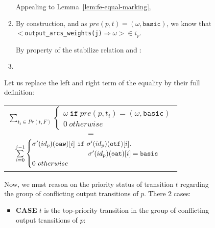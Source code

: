 \documentclass[dvipsnames,12pt]{article}
\begin{document}
\begin{niproof}
\begin{enumerate}
\begin{itemize}
\begin{itemize}
\begin{enumerate}
          Appealing to Lemma~\ref{lem:fe-equal-marking},
        \item {}

          By construction, and as
          $pre(p,t)=(\omega,\mathtt{basic})$, we know that
          ${<}$\texttt{output\_arcs\_weights(j)}$\Rightarrow\omega{>}\in{}i_p$.

          By property of the stabilize relation and \InCsCompP:\\
          
        \item
        \end{enumerate}
        
        Let us replace the left and right term of the equality by
        their full definition:

        \begin{frameb}
          \begin{tabular}{c}
            $\sum\limits_{t_i\in{}Pr(t,F)}
            \begin{cases}
              \omega~\mathtt{if}~pre(p,t_i)=(\omega,\mathtt{basic})\\
              0~otherwise
            \end{cases}$ \\
            $=$ \\
            $\sum\limits_{i=0}^{j-1}
            \begin{cases}
              \sigma'(id_p)(\texttt{oaw})[i]~\mathtt{if}~\sigma'(id_p)(\texttt{otf})[i].\\
              \hspace{19ex}\sigma'(id_p)(\texttt{oat})[i]=\mathtt{basic}\\
              0~otherwise\\
            \end{cases}$ \\
          \end{tabular}
        \end{frameb}

        Now, we must reason on the priority status of transition
        $t$ regarding the group of conflicting output transitions
        of $p$. There 2 cases:
          
        \begin{itemize}
        \item \textbf{CASE} $t$ is the top-priority transition in
          the group of conflicting output transitions of $p$:


\end{itemize}
\end{itemize}
\end{itemize}
\end{enumerate}
\end{niproof}
\end{document}
